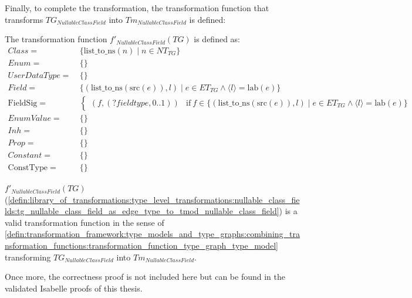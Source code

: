 Finally, to complete the transformation, the transformation function that transforms $TG_{NullableClassField}$ into $Tm_{NullableClassField}$ is defined:

\begin{defin}
\label{defin:library_of_transformations:type_level_transformations:nullable_class_fields:tg_nullable_class_field_as_edge_type_to_tmod_nullable_class_field}
The transformation function $f'_{NullableClassField}(TG)$ is defined as:
\begin{align*}
Class =\ &\{\mathrm{list\_\!to\_\!ns}(n) \mid n \in NT_{TG} \} \\
Enum =\ &\{\} \\
UserDataType =\ &\{\} \\
Field =\ &\{(\mathrm{list\_\!to\_\!ns}(\mathrm{src}(e)), l) \mid e \in ET_{TG} \land \langle l \rangle = \mathrm{lab}(e) \} \\
\mathrm{FieldSig} =\ &\begin{cases}
    (f, (?fieldtype, 0..1)) &\mathrm{if}\ f \in \{(\mathrm{list\_\!to\_\!ns}(\mathrm{src}(e)), l) \mid e \in ET_{TG} \land \langle l \rangle = \mathrm{lab}(e) \} 
\end{cases} \\
EnumValue =\ &\{\} \\
Inh =\ &\{\} \\
Prop =\ &\{\} \\
Constant =\ &\{\} \\
\mathrm{ConstType} =\ &\{\}
\end{align*}
\end{defin}

\begin{thm}
\label{defin:library_of_transformations:type_level_transformations:nullable_class_fields:tg_nullable_class_field_as_edge_type_to_tmod_nullable_class_field_func}
$f'_{NullableClassField}(TG)$ (\cref{defin:library_of_transformations:type_level_transformations:nullable_class_fields:tg_nullable_class_field_as_edge_type_to_tmod_nullable_class_field}) is a valid transformation function in the sense of \cref{defin:transformation_framework:type_models_and_type_graphs:combining_transformation_functions:transformation_function_type_graph_type_model} transforming $TG_{NullableClassField}$ into $Tm_{NullableClassField}$.
\end{thm}

Once more, the correctness proof is not included here but can be found in the validated Isabelle proofs of this thesis.